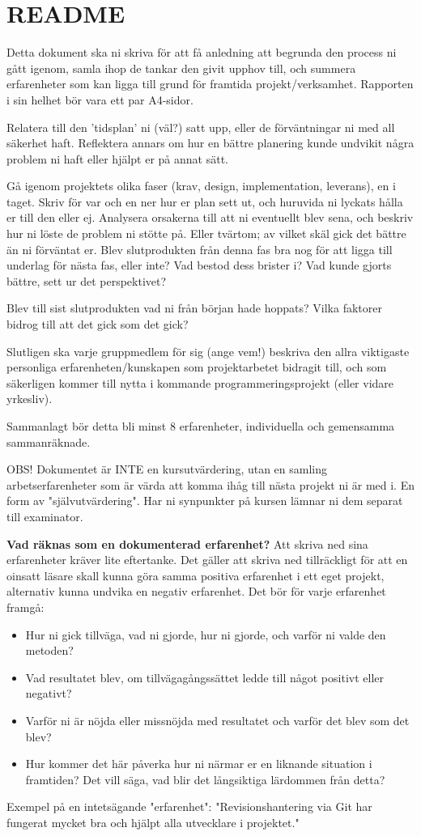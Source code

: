 \section{README}
Detta dokument ska ni skriva för att få anledning att begrunda den process ni gått igenom, samla ihop de tankar den givit upphov till,
och summera erfarenheter som kan ligga till grund för framtida projekt/verksamhet. Rapporten i sin helhet bör vara ett par A4-sidor.

Relatera till den 'tidsplan' ni (väl?) satt upp, eller de förväntningar ni med all säkerhet haft. Reflektera annars om hur en bättre
planering kunde undvikit några problem ni haft eller hjälpt er på annat sätt.

Gå igenom projektets olika faser (krav, design, implementation, leverans), en i taget. Skriv för var och en ner hur er plan sett ut,
och huruvida ni lyckats hålla er till den eller ej. Analysera orsakerna till att ni eventuellt blev sena, och beskriv hur ni löste de
problem ni stötte på. Eller tvärtom; av vilket skäl gick det bättre än ni förväntat er. Blev slutprodukten från denna fas bra nog för
att ligga till underlag för nästa fas, eller inte? Vad bestod dess brister i? Vad kunde gjorts bättre, sett ur det perspektivet?

Blev till sist slutprodukten vad ni från början hade hoppats? Vilka faktorer bidrog till att det gick som det gick?

Slutligen ska varje gruppmedlem för sig (ange vem!) beskriva den allra viktigaste personliga erfarenheten/kunskapen som projektarbetet
bidragit till, och som säkerligen kommer till nytta i kommande programmeringsprojekt (eller vidare yrkesliv).

Sammanlagt bör detta bli minst 8 erfarenheter, individuella och gemensamma sammanräknade.

OBS! Dokumentet är INTE en kursutvärdering, utan en samling arbetserfarenheter som är värda att komma ihåg till nästa projekt ni är med i.
En form av "självutvärdering". Har ni synpunkter på kursen lämnar ni dem separat till examinator.

\textbf{Vad räknas som en dokumenterad erfarenhet?}
Att skriva ned sina erfarenheter kräver lite eftertanke. Det gäller att skriva ned tillräckligt för att en oinsatt läsare skall kunna göra
samma positiva erfarenhet i ett eget projekt, alternativ kunna undvika en negativ erfarenhet. Det bör för varje erfarenhet framgå:

\begin{itemize}
  \item Hur ni gick tillväga, vad ni gjorde, hur ni gjorde, och varför ni valde den metoden?
  \item Vad resultatet blev, om tillvägagångssättet ledde till något positivt eller negativt?
  \item Varför ni är nöjda eller missnöjda med resultatet och varför det blev som det blev?
  \item Hur kommer det här påverka hur ni närmar er en liknande situation i framtiden? Det vill säga, vad blir det långsiktiga lärdommen från detta?
\end{itemize}
Exempel på en intetsägande "erfarenhet": "Revisionshantering via Git har fungerat mycket bra och hjälpt alla utvecklare i projektet."

